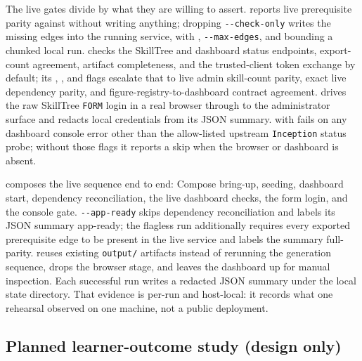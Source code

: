 \documentclass[
  english,
]{article}
\begin{document}
The live gates divide by what they are willing to assert.
 reports live
prerequisite parity against 
without writing anything; dropping \texttt{-\/-check-only} writes the
missing edges into the running service, with
, \texttt{-\/-max-edges}, and
 bounding a chunked local run.
 checks the SkillTree
and dashboard status endpoints, export-count agreement, artifact
completeness, and the trusted-client token exchange by default; its
, ,
and  flags escalate that to live
admin skill-count parity, exact live dependency parity, and
figure-registry-to-dashboard contract agreement.
 drives the raw SkillTree
\texttt{FORM} login in a real browser through to the administrator
surface and redacts local credentials from its JSON summary.
 with
 fails on any
dashboard console error other than the allow-listed upstream
\texttt{Inception} status probe; without those flags it reports a skip
when the browser or dashboard is absent.

 composes the live sequence end to
end: Compose bring-up, seeding, dashboard start, dependency
reconciliation, the live dashboard checks, the form login, and the
console gate. \texttt{-\/-app-ready} skips dependency reconciliation and
labels its JSON summary app-ready; the flagless run additionally
requires every exported prerequisite edge to be present in the live
service and labels the summary full-parity. 
reuses existing \texttt{output/} artifacts instead of rerunning the
generation sequence,  drops the browser stage,
and  leaves the dashboard up for manual
inspection. Each successful run writes a redacted JSON summary under the
local state directory. That evidence is per-run and host-local: it
records what one rehearsal observed on one machine, not a public
deployment.

\subsection{Planned learner-outcome study (design
only)}\label{planned-learner-outcome-study-design-only}
\end{document}
